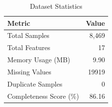 \begin{table}[ht]
\centering
\caption{Dataset Statistics}
\label{tab:dataset_stats}
\begin{tabular}{|l|r|}
\hline
\textbf{Metric} & \textbf{Value} \\
\hline
Total Samples & 8,469 \\
Total Features & 17 \\
Memory Usage (MB) & 9.90 \\
Missing Values & 19919 \\
Duplicate Samples & 0 \\
Completeness Score (\%) & 86.16 \\
\hline
\end{tabular}
\end{table}
